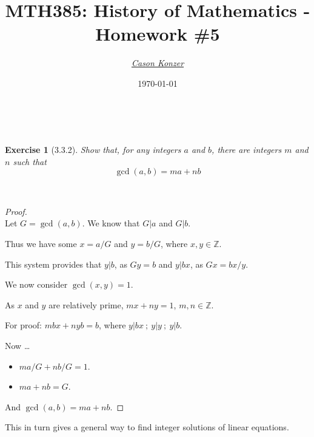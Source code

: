 \documentclass[12pt]{article}
\newcommand{\XB}{\color{black}}
\newcommand{\XBB}{\color{blue}}
\newcommand{\XV}{\color{violet}}
\newcommand{\ds}{\displaystyle}
\theoremstyle{plain}
\newtheorem{ex}{Exercise}
\begin{document}
\title{\textbf{MTH385}: History of Mathematics - Homework \#5}
\date{\today}
\author{\XV\textit{\large{\href{https://github.com/casonk}{Cason Konzer}}}\XB}

\maketitle

\hrulefill

\newpage

\XBB\hrulefill\XB \\
\begin{ex} [3.3.2]
  Show that, for any integers $ a $ and $ b $, there are integers $ m $ and $ n $ such that
  \[
    \gcd(a, b) = ma + nb
  \]
\end{ex}
\XBB\hrulefill\XB \\

\begin{proof}
  \ \\

  Let $ G = \gcd(a, b) $.
  We know that $ G | a $ and $ G | b $.

  Thus we have some $ x = a/G $ and $ y = b/G $, where $ x, y \in \mathbb{Z} $.

  This system provides that $ y | b $, as $ Gy = b $ and $ y | bx $, as $ Gx = bx/y $.

  We now consider $ \gcd(x,y) = 1 $.

  As $ x $ and $ y $ are relatively prime, $ mx + ny = 1 $, $ m, n \in \mathbb{Z} $.

  For proof: $ mbx + nyb = b $, where $ y | bx \ ; \ y | y \ ; \ y | b $.

  Now \dots

  \begin{itemize}
    \item $ \ds ma/G + nb/G = 1 $.
    \item $ \ds ma + nb = G $.
  \end{itemize}

  And $ \gcd(a, b) = ma + nb $.
\end{proof}

\vfill

\begin{center}
  This in turn gives a general way to find integer solutions of linear equations.
\end{center}
\end{document}
